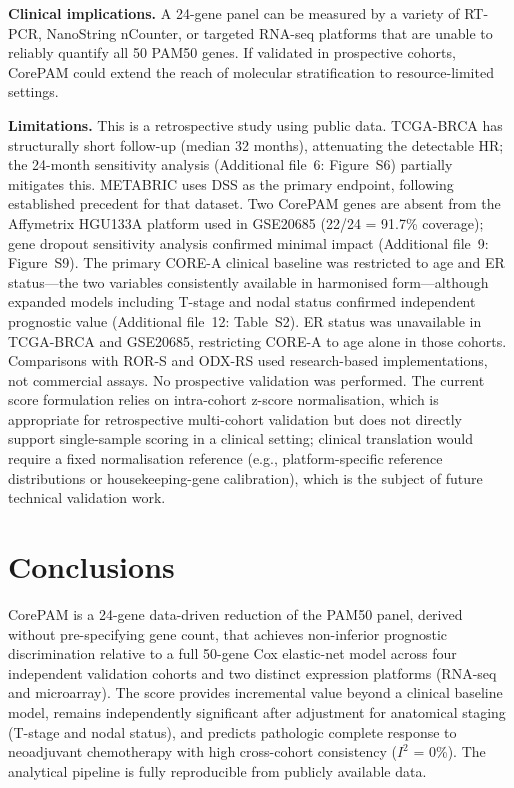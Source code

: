\documentclass[referee,lineno,pdflatex,sn-vancouver-num]{sn-jnl}
\begin{document}
\textbf{Clinical implications.} A 24-gene panel can be measured by a variety of RT-PCR, NanoString nCounter, or targeted RNA-seq platforms that are unable to reliably quantify all 50 PAM50 genes. If validated in prospective cohorts, CorePAM could extend the reach of molecular stratification to resource-limited settings.

\textbf{Limitations.} This is a retrospective study using public data. TCGA-BRCA has structurally short follow-up (median 32 months), attenuating the detectable HR; the 24-month sensitivity analysis (Additional file~6: Figure~S6) partially mitigates this. METABRIC uses DSS as the primary endpoint, following established precedent for that dataset. Two CorePAM genes are absent from the Affymetrix HGU133A platform used in GSE20685 (22/24 = 91.7\% coverage); gene dropout sensitivity analysis confirmed minimal impact (Additional file~9: Figure~S9). The primary CORE-A clinical baseline was restricted to age and ER status---the two variables consistently available in harmonised form---although expanded models including T-stage and nodal status confirmed independent prognostic value (Additional file~12: Table~S2). ER status was unavailable in TCGA-BRCA and GSE20685, restricting CORE-A to age alone in those cohorts. Comparisons with ROR-S and ODX-RS used research-based implementations, not commercial assays. No prospective validation was performed. The current score formulation relies on intra-cohort z-score normalisation, which is appropriate for retrospective multi-cohort validation but does not directly support single-sample scoring in a clinical setting; clinical translation would require a fixed normalisation reference (e.g., platform-specific reference distributions or housekeeping-gene calibration), which is the subject of future technical validation work.

\section{Conclusions}\label{sec:conclusions}

CorePAM is a 24-gene data-driven reduction of the PAM50 panel, derived without pre-specifying gene count, that achieves non-inferior prognostic discrimination relative to a full 50-gene Cox elastic-net model across four independent validation cohorts and two distinct expression platforms (RNA-seq and microarray). The score provides incremental value beyond a clinical baseline model, remains independently significant after adjustment for anatomical staging (T-stage and nodal status), and predicts pathologic complete response to neoadjuvant chemotherapy with high cross-cohort consistency ($I^2$ = 0\%). The analytical pipeline is fully reproducible from publicly available data.
\end{document}
